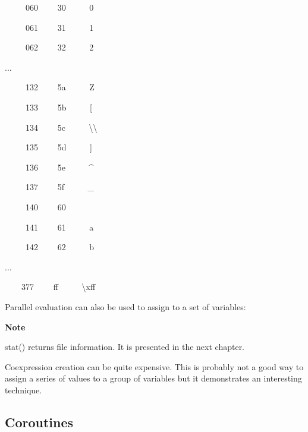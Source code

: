 { \ \ \ \ \ 060 \ \ \ \ 30 \ \ \ \ \ {\textquotedbl}0{\textquotedbl}}

{ \ \ \ \ \ 061 \ \ \ \ 31 \ \ \ \ \ {\textquotedbl}1{\textquotedbl}}

{ \ \ \ \ \ 062 \ \ \ \ 32 \ \ \ \ \ {\textquotedbl}2{\textquotedbl}}

{\sffamily
...}

{ \ \ \ \ \ 132 \ \ \ \ 5a \ \ \ \ \ {\textquotedbl}Z{\textquotedbl}}

{ \ \ \ \ \ 133 \ \ \ \ 5b \ \ \ \ \ {\textquotedbl}[{\textquotedbl}}

{ \ \ \ \ \ 134 \ \ \ \ 5c
\ \ \ \ \ {\textquotedbl}{\textbackslash}{\textbackslash}{\textquotedbl}}

{ \ \ \ \ \ 135 \ \ \ \ 5d \ \ \ \ \ {\textquotedbl}]{\textquotedbl}}

{ \ \ \ \ \ 136 \ \ \ \ 5e
\ \ \ \ \ {\textquotedbl}\^{}{\textquotedbl}}

{ \ \ \ \ \ 137 \ \ \ \ 5f \ \ \ \ \ {\textquotedbl}\_{\textquotedbl}}

{ \ \ \ \ \ 140 \ \ \ \ 60
\ \ \ \ \ {\textquotedbl}{\textasciigrave}{\textquotedbl}}

{ \ \ \ \ \ 141 \ \ \ \ 61 \ \ \ \ \ {\textquotedbl}a{\textquotedbl}}

{ \ \ \ \ \ 142 \ \ \ \ 62 \ \ \ \ \ {\textquotedbl}b{\textquotedbl}}

{\sffamily
...}

{ \ \ \ \ 377 \ \ \ \ ff
\ \ \ \ \ {\textquotedbl}{\textbackslash}xff{\textquotedbl}}

\noindent
Parallel evaluation can also be used to assign to a set of variables:



{\sffamily\bfseries
Note}

{\sffamily
stat() returns file information. It is presented in the next chapter.}

Coexpression creation can be quite expensive. This is probably not a
good way to assign a series of values to a group of variables but it
demonstrates an interesting technique.

\subsection{Coroutines}

